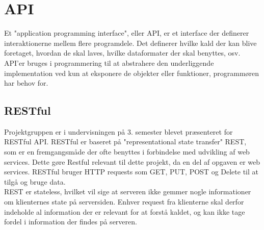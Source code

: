 \section{API}\label{sec:api}
Et "application programming interface", eller API, er et interface der definerer interaktionerne
mellem flere programdele. Det definerer hvilke kald der kan blive foretaget, hvordan de skal laves, 
hvilke dataformater der skal benyttes, osv. API'er bruges i programmering til at abstrahere den underliggende
implementation ved kun at eksponere de objekter eller funktioner, programmøren har behov for. \\

\subsection{RESTful}
Projektgruppen er i undervisningen på 3. semester blevet præsenteret for RESTful API. RESTful er
baseret på "representational state transfer" REST, som er en fremgangsmåde der ofte benyttes i forbindelse med
udvikling af web services. Dette gøre Restful relevant til dette projekt, da en del af opgaven er web services.
RESTful bruger HTTP requests som GET, PUT, POST og Delete til at tilgå og bruge data. \\

REST er stateless, hvilket vil sige at serveren ikke gemmer nogle informationer om klienternes state på serversiden.
Enhver request fra klienterne skal derfor indeholde al information der er relevant for at forstå kaldet, og kan ikke
tage fordel i information der findes på serveren. 
